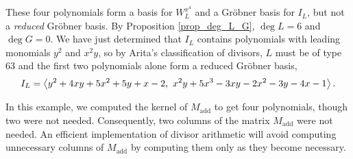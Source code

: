 These four polynomials form a basis for $W_L^{x^4}$ and a Gr\"obner basis for $I_L$,
but not a \emph{reduced} Gr\"obner basis.
By Proposition \ref{prop_deg_L_G}, $\deg L = 6$ and $\deg G = 0$.
We have just determined that $I_L$ contains polynomials with leading monomials $y^2$ and $x^2y$,
so by Arita's classification of divisors, $L$ must be of type 63 and the first two polynomials
alone form a reduced Gr\"obner basis,
  \[ I_L = \left\langle  y^2 + 4xy + 5x^2 + 5y + x - 2, ~x^2y + 5x^3 - 3xy - 2x^2 - 3y - 4x - 1 \right\rangle.\]

\begin{remark}
In this example, we computed the kernel of $M_{\text{add}}$ to get four polynomials, though two were not needed.
Consequently, two columns of the matrix $M_{\text{add}}$ were not needed.
An efficient implementation of divisor arithmetic will avoid computing unnecessary columns of $M_{\text{add}}$
by computing them only as they become necessary.
\end{remark}





